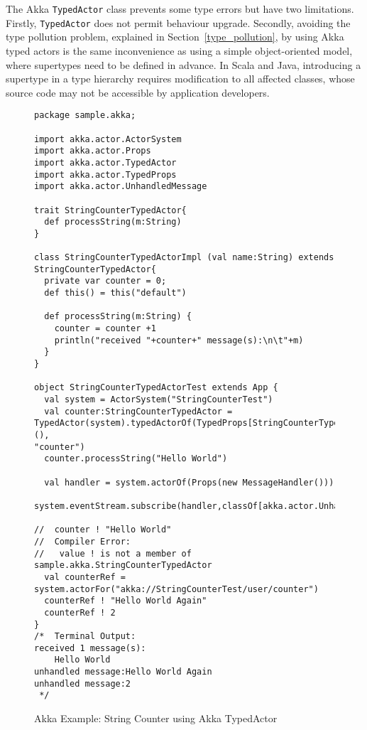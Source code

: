 The Akka {\tt TypedActor} class prevents some type errors but have two limitations. Firstly, {\tt TypedActor} does not 
permit behaviour upgrade.  Secondly, avoiding the type pollution 
problem, explained in Section~\ref{type_pollution}, by 
using Akka typed actors is the same inconvenience as using a simple object-oriented 
model, where supertypes need to be defined in advance.  In Scala and Java, 
introducing a supertype in a type hierarchy requires modification to all 
affected classes, whose source code may not be accessible by application 
developers.


\begin{figure}[p]

\begin{lstlisting}
package sample.akka;

import akka.actor.ActorSystem
import akka.actor.Props
import akka.actor.TypedActor
import akka.actor.TypedProps
import akka.actor.UnhandledMessage

trait StringCounterTypedActor{
  def processString(m:String) 
}

class StringCounterTypedActorImpl (val name:String) extends 
StringCounterTypedActor{
  private var counter = 0;
  def this() = this("default")
  
  def processString(m:String) {
    counter = counter +1
    println("received "+counter+" message(s):\n\t"+m)
  }
}

object StringCounterTypedActorTest extends App {
  val system = ActorSystem("StringCounterTest")
  val counter:StringCounterTypedActor = 
TypedActor(system).typedActorOf(TypedProps[StringCounterTypedActorImpl](), 
"counter")
  counter.processString("Hello World")
  
  val handler = system.actorOf(Props(new MessageHandler()))
  system.eventStream.subscribe(handler,classOf[akka.actor.UnhandledMessage]);
  
//  counter ! "Hello World"  
//  Compiler Error:  
//   value ! is not a member of sample.akka.StringCounterTypedActor
  val counterRef = system.actorFor("akka://StringCounterTest/user/counter")
  counterRef ! "Hello World Again"
  counterRef ! 2
}
/*  Terminal Output:
received 1 message(s):
	Hello World
unhandled message:Hello World Again
unhandled message:2
 */		
\end{lstlisting}
\caption{Akka Example: String Counter using Akka TypedActor}
\label{akka typed actor}
\end{figure}



